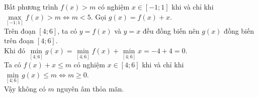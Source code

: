 \begin{vd}[Mức độ 3]
{\begin{itemchoice}
			Bất phương trình $f(x)>m$ có nghiệm $x\in[-1;1]$ khi và chỉ khi $\max\limits_{[-1;1]} f(x)>m\Leftrightarrow m<5$.
			\itemch Gọi $g(x)=f(x)+x$.\\ 
			Trên đoạn $[4;6]$, ta có $y=f(x)$ và $y=x$ đều đồng biến nên $g(x)$ đồng biến trên đoạn $[4;6]$.\\
			Khi đó $\min\limits_{[4;6]}g(x)=\min\limits_{[4;6]}f(x)+\min\limits_{[4;6]}x=-4+4=0$.\\ 
			Ta có $f(x)+x\le m$ có nghiệm $x\in[4;6]$ khi và chỉ khi $\min\limits_{[4;6]}g(x)\le m\Leftrightarrow m\ge0$.\\
			Vậy không có $m$ nguyên âm thỏa mãn.
		\end{itemchoice}
	}
\end{vd}

